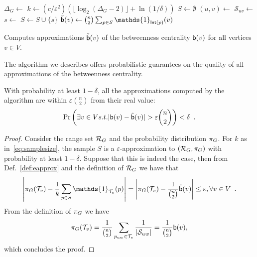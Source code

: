 \begin{algorithm}[ht]
   \DontPrintSemicolon
  $\Delta_G\leftarrow$\label{alg:diamcomp}\; 
  $k\leftarrow (c/\varepsilon^2)(\lfloor\log_2(\Delta_G-2)\rfloor+\ln(1/\delta))$\;
  $S\leftarrow\emptyset$\;
   {
  $(u,v)\leftarrow$\;
  $\mathcal{S}_{uv}\leftarrow$\;
  $s\leftarrow$\;
  $S\leftarrow S\cup\{s\}$\;
  }
   {
  $\tilde\betw(v)\leftarrow\binom{n}{2}\sum_{p\in
  S}\mathds{1}_{\mathsf{Int}(p)}(v)$\;
  }
  \caption{Computes approximations $\tilde{\mathsf{b}}(v)$ of the betweenness
  centrality $\mathsf{b}(v)$ for all vertices $v\in V$.}
  \label{alg:algorithm}
\end{algorithm}

The algorithm we describes offers probabilistic guarantees on the quality of all
approximations of the betweenness centrality.
\begin{lemma}\label{lem:correctness}
  With probability at least $1-\delta$, all the approximations computed by the
  algorithm are within $\varepsilon\binom{n}{2}$ from their real value:
  \[
  \Pr\left(\exists v\in V \mbox{ s.t. }
  |\betw(v)-\tilde\betw(v)|>\varepsilon\binom{n}{2}\right)<\delta\enspace .
  \]
\end{lemma}

\begin{proof}
  Consider the range set $\mathcal{R}_G$ and the probability distribution $\pi_G$.
  For $k$ as in~\eqref{eq:samplesize}, the sample $S$ is a
  $\varepsilon$-approximation to $(\mathcal{R}_G,\pi_G)$ with probability at least
  $1-\delta$. Suppose that this is indeed the case, then from
  Def.~\ref{def:eapprox} and the definition of $\mathcal{R}_G$ we have that
  \[
  \left|\prob_G(\mathcal{T}_v) - \frac{1}{k}\sum_{p\in
  S}\mathds{1}_{\mathcal{T}_v}(p)\right|=\left|\prob_G(\mathcal{T}_v) -
  \frac{1}{\binom{n}{2}}\tilde\betw(v)\right|\le\varepsilon, \forall v\in
  V\enspace.
  \]
  From the definition of $\pi_G$ we have
  \[
  \pi_G(\mathcal{T}_v)=\frac{1}{\binom{n}{2}}\sum_{p_{uw}\in\mathcal{T}_v}\frac{1}{|\mathcal{S}_{uw}|}=\frac{1}{\binom{n}{2}}\mathsf{b}(v),
  \]
  which concludes the proof.
\end{proof}


